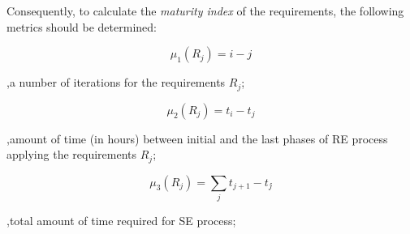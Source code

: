 Consequently, to calculate the \textit{maturity index} of the requirements, the following metrics should be determined:

 \begin{equation}\label{eqn:mu1}
\mu_{1}(R_{j}) = i-j
	\end{equation}
	
,\textrm{a number of iterations for the requirements} $R_{j}$;

 \begin{equation}\label{eqn:mu2}
\mu_{2}(R_{j}) = t_{i}-t_{j}    
 \end{equation}

,\textrm{amount of time (in hours) between initial and the last phases of RE process applying the requirements} $R_{j}$;

\begin{equation}\label{eqn:mu3}
\mu_{3}(R_{j}) = \displaystyle\sum_{j} t_{j+1}-t_{j}\acute{}
 \end{equation}

,\textrm{total amount of time required for SE process};

